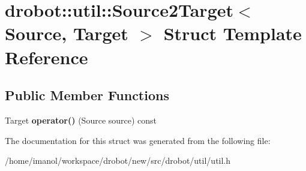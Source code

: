 \hypertarget{structdrobot_1_1util_1_1Source2Target}{\section{drobot\-:\-:util\-:\-:Source2\-Target$<$ Source, Target $>$ Struct Template Reference}
\label{structdrobot_1_1util_1_1Source2Target}
}
\subsection*{Public Member Functions}
\begin{DoxyCompactItemize}
\item 
\hypertarget{structdrobot_1_1util_1_1Source2Target_aa64b7be3ffe978effc115e00bfac261d}{Target {\bfseries operator()} (Source source) const }\label{structdrobot_1_1util_1_1Source2Target_aa64b7be3ffe978effc115e00bfac261d}

\end{DoxyCompactItemize}


The documentation for this struct was generated from the following file\-:\begin{DoxyCompactItemize}
\item 
/home/imanol/workspace/drobot/new/src/drobot/util/util.\-h\end{DoxyCompactItemize}
